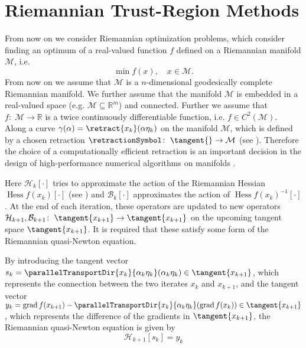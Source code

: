 \section{Riemannian Trust-Region Methods}


From now on we consider Riemannian optimization problems, which consider finding an optimum of a real-valued function $f$ defined on a Riemannian manifold $\mathcal{M}$, i.e.
\begin{equation*}
    \min f(x), \quad x \in \mathcal{M}.
\end{equation*}
From now on we assume that $\mathcal{M}$ is a $n$-dimensional geodesically complete Riemannian manifold. We further assume that the manifold $\mathcal{M}$ is embedded in a real-valued space (e.g. $\mathcal{M} \subseteq \mathbb{R}^m$) and connected. Further we assume that $f \colon \; \mathcal{M} \to \mathbb{R}$ is a twice continuously differentiable function, i.e. $f \in C^2(\mathcal{M})$. \\


Along a curve $\gamma(\alpha) = \retract{x_k}(\alpha \eta_k)$ on the manifold $\mathcal{M}$, which is defined by a chosen retraction $\retractionSymbol \colon \; \tangent{} \to \mathcal{M}$ (see \cite[Definition~4.1.1]{AbsilMahonySepulchre:2008}). Therefore the choice of a computationally efficient retraction is an important decision in the design of high-performance numerical algorithms on manifolds \cite[p.~54]{AbsilMahonySepulchre:2008}.

Here $\mathcal{H}_k [\cdot]$ tries to approximate the action of the Riemannian Hessian $\operatorname{Hess} f(x_k) [\cdot]$ (see \cite[Definition~5.5.1]{AbsilMahonySepulchre:2008}) and $\mathcal{B}_k [\cdot]$ approximates the action of ${\operatorname{Hess} f(x_k)}^{-1} [\cdot]$. At the end of each iteration, these operators are updated to new operators $\mathcal{H}_{k+1}, \mathcal{B}_{k+1} \colon \; \tangent{x_{k+1}} \to \tangent{x_{k+1}}$ on the upcoming tangent space $\tangent{x_{k+1}}$. It is required that these satisfy some form of the Riemannian quasi-Newton equation. 

By introducing the tangent vector $s_k = \parallelTransportDir{x_k}{\alpha_k \eta_k}(\alpha_k \eta_k) \in \tangent{x_{k+1}}$, which represents the connection between the two iterates $x_k$ and $x_{k+1}$, and the tangent vector $y_k = \operatorname{grad} f(x_{k+1}) - \parallelTransportDir{x_k}{\alpha_k \eta_k}(\operatorname{grad} f(x_k)) \in \tangent{x_{k+1}}$, which represents the difference of the gradients in $\tangent{x_{k+1}}$, the Riemannian quasi-Newton equation is given by 
\begin{equation*}
    \mathcal{H}_{k+1} [s_k] = y_k 
\end{equation*}

